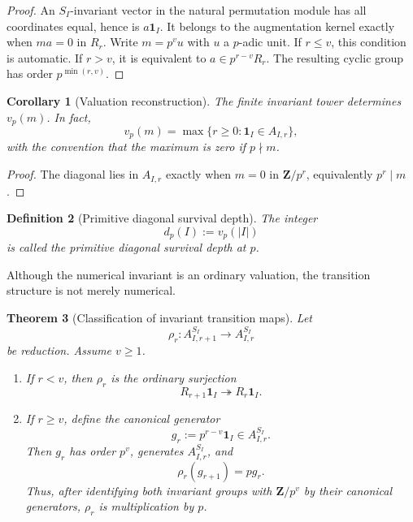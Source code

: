 \documentclass[11pt]{article}
\newtheorem{theorem}{Theorem}[section]
\newtheorem{corollary}[theorem]{Corollary}
\newtheorem{definition}[theorem]{Definition}
\theoremstyle{remark}
\newcommand{\Z}{\mathbf Z}
\begin{document}
\begin{proof}
An \(S_I\)-invariant vector in the natural permutation module has all coordinates equal, hence is \(a\mathbf1_I\).  It belongs to the augmentation kernel exactly when \(ma=0\) in \(R_r\).  Write \(m=p^v u\) with \(u\) a \(p\)-adic unit.  If \(r\le v\), this condition is automatic.  If \(r>v\), it is equivalent to \(a\in p^{r-v}R_r\).  The resulting cyclic group has order \(p^{\min(r,v)}\).
\end{proof}

\begin{corollary}[Valuation reconstruction]\label{P1C-cor:valuation-reconstruction}
The finite invariant tower determines \(v_p(m)\).  In fact,
\[
 \boxed{
 v_p(m)=\max\{r\ge0:\mathbf1_I\in A_{I,r}\},}
\]
with the convention that the maximum is zero if \(p\nmid m\).
\end{corollary}

\begin{proof}
The diagonal lies in \(A_{I,r}\) exactly when \(m=0\) in \(\Z/p^r\), equivalently \(p^r\mid m\).
\end{proof}

\begin{definition}[Primitive diagonal survival depth]
The integer
\[
 d_p(I):=v_p(|I|)
\]
is called the primitive diagonal survival depth at \(p\).
\end{definition}

Although the numerical invariant is an ordinary valuation, the transition structure is not merely numerical.

\begin{theorem}[Classification of invariant transition maps]\label{P1C-thm:transition-classification}
Let
\[
 \rho_r:A_{I,r+1}^{S_I}\longrightarrow A_{I,r}^{S_I}
\]
be reduction.  Assume \(v\ge1\).
\begin{enumerate}[label=\textup{(\roman*)}]
\item If \(r<v\), then \(\rho_r\) is the ordinary surjection
\[
 R_{r+1}\mathbf1_I\twoheadrightarrow R_r\mathbf1_I.
\]
\item If \(r\ge v\), define the canonical generator
\[
 g_r:=p^{r-v}\mathbf1_I\in A_{I,r}^{S_I}.
\]
Then \(g_r\) has order \(p^v\), generates \(A_{I,r}^{S_I}\), and
\[
 \boxed{\rho_r(g_{r+1})=p g_r.}
\]
Thus, after identifying both invariant groups with \(\Z/p^v\) by their canonical generators, \(\rho_r\) is multiplication by \(p\).
\end{enumerate}
\end{theorem}
\end{document}
